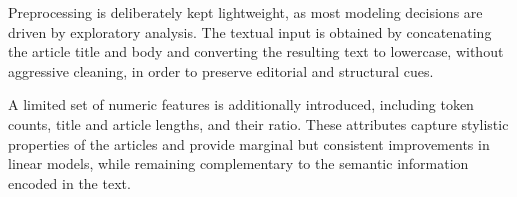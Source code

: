 

Preprocessing is deliberately kept lightweight, as most modeling decisions are driven by exploratory analysis. The textual input is obtained by concatenating the article title and body and converting the resulting text to lowercase, without aggressive cleaning, in order to preserve editorial and structural cues.

A limited set of numeric features is additionally introduced, including token counts, title and article lengths, and their ratio. These attributes capture stylistic properties of the articles and provide marginal but consistent improvements in linear models, while remaining complementary to the semantic information encoded in the text.
